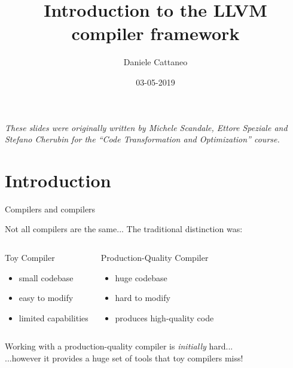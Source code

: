 \documentclass[10pt,mathserif]{beamer}
\author{Daniele Cattaneo}
\institute{Politecnico di Milano}
\date{03-05-2019}
\title{Introduction to the LLVM compiler framework}
\begin{document}
\begin{frame}
\maketitle
\begin{center}
\itshape\scriptsize These slides were originally written by
                    Michele Scandale, Ettore Speziale and Stefano Cherubin for the 
                    ``Code Transformation and Optimization'' course.
\end{center}
\end{frame}


\section{Introduction}


\begin{frame}{Compilers and compilers}
\begin{center}
Not all compilers are the same... The traditional distinction was:

\begin{columns}[t]

\begin{block}{Toy Compiler}
\begin{itemize}
\item small codebase
\item easy to modify
\item limited capabilities
\end{itemize}
\end{block}

\begin{block}{Production-Quality Compiler}
\begin{itemize}
\item huge codebase
\item hard to modify
\item produces high-quality code
\end{itemize}
\end{block}

\end{columns}
\bigskip
Working with a production-quality compiler is \emph{initially} \alert{hard}...\\
\medskip
...however it provides a huge set of tools that toy compilers \alert{miss}!
\end{center}
\end{frame}
\end{document}
